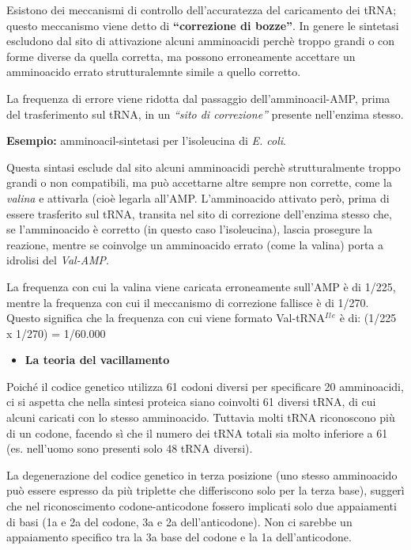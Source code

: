 \documentclass[11pt]{book}
\begin{document}
Esistono dei meccanismi di controllo dell'accuratezza del caricamento
dei tRNA; questo meccanismo viene detto di \textbf{``correzione di
bozze''}. In genere le sintetasi escludono dal sito di attivazione
alcuni amminoacidi perchè troppo grandi o con forme diverse da quella
corretta, ma possono erroneamente accettare un amminoacido errato
strutturalemnte simile a quello corretto.

La frequenza di errore viene ridotta dal passaggio dell'amminoacil-AMP,
prima del trasferimento sul tRNA, in un \emph{``sito di correzione''}
presente nell'enzima stesso.

\textbf{Esempio:} amminoacil-sintetasi per l'isoleucina di \emph{E.
coli}.

Questa sintasi esclude dal sito alcuni amminoacidi perchè
strutturalmente troppo grandi o non compatibili, ma può accettarne altre
sempre non corrette, come la \emph{valina} e attivarla (cioè legarla
all'AMP. L'amminoacido attivato però, prima di essere trasferito sul
tRNA, transita nel sito di correzione dell'enzima stesso che, se
l'amminoacido è corretto (in questo caso l'isoleucina), lascia prosegure
la reazione, mentre se coinvolge un amminoacido errato (come la valina)
porta a idrolisi del \emph{Val-AMP}.

La frequenza con cui la valina viene caricata erroneamente sull'AMP è di
1/225, mentre la frequenza con cui il meccanismo di correzione fallisce
è di 1/270. Questo significa che la frequenza con cui viene formato
Val-tRNA\(^I\)\(^l\)\(^e\) è di: (1/225 x 1/270) = 1/60.000

\begin{itemize}
\itemsep1pt\parskip0pt
\item
  \textbf{La teoria del vacillamento}
\end{itemize}

Poiché il codice genetico utilizza 61 codoni diversi per specificare 20
amminoacidi, ci si aspetta che nella sintesi proteica siano coinvolti 61
diversi tRNA, di cui alcuni caricati con lo stesso amminoacido. Tuttavia
molti tRNA riconoscono più di un codone, facendo sì che il numero dei
tRNA totali sia molto inferiore a 61 (es. nell'uomo sono presenti solo
48 tRNA diversi).

La degenerazione del codice genetico in terza posizione (uno stesso
amminoacido può essere espresso da più triplette che differiscono solo
per la terza base), suggerì che nel riconoscimento codone-anticodone
fossero implicati solo due appaiamenti di basi (1a e 2a del codone, 3a e
2a dell'anticodone). Non ci sarebbe un appaiamento specifico tra la 3a
base del codone e la 1a dell'anticodone.
\end{document}
